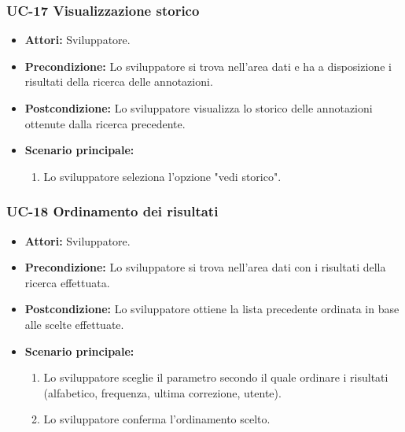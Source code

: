 	\subsubsection{UC-17 Visualizzazione storico}		
		\begin{itemize}
			\item \textbf{Attori:} Sviluppatore.
			\item \textbf{Precondizione:} Lo sviluppatore si trova nell'area dati e ha a disposizione i risultati della ricerca delle annotazioni.
			\item \textbf{Postcondizione:} Lo sviluppatore visualizza lo storico delle annotazioni ottenute dalla ricerca precedente.
			\item \textbf{Scenario principale:}
			\begin{enumerate}
				\item Lo sviluppatore seleziona l'opzione "vedi storico".
			\end{enumerate}
		\end{itemize}	
		
	\subsubsection{UC-18 Ordinamento dei risultati}
		\begin{itemize}
			\item \textbf{Attori:} Sviluppatore.
			\item \textbf{Precondizione:} Lo sviluppatore si trova nell'area dati con i risultati della ricerca effettuata.
			\item \textbf{Postcondizione:} Lo sviluppatore ottiene la lista precedente ordinata in base alle scelte effettuate.
			\item \textbf{Scenario principale:}
				\begin{enumerate}
					\item Lo sviluppatore sceglie il parametro secondo il quale ordinare i risultati (alfabetico, frequenza, ultima correzione, utente).
					\item Lo sviluppatore conferma l'ordinamento scelto.
				\end{enumerate}
		\end{itemize} 
	
